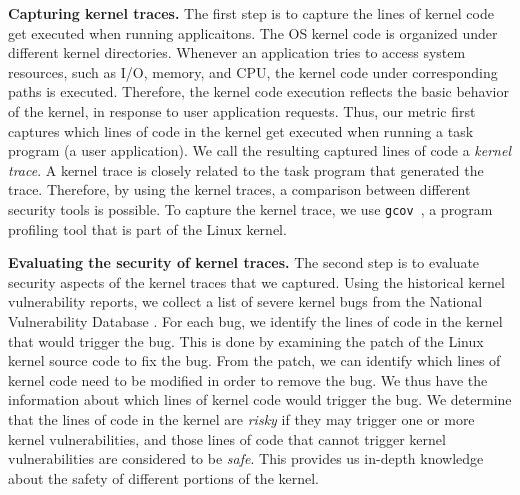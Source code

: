 {\bf Capturing kernel traces.}
The first step is to capture the lines of kernel code get executed when 
running applicaitons. The OS kernel code is organized under different kernel directories. 
Whenever an application tries to access system resources, such as I/O, memory, and CPU, the kernel code 
under corresponding paths is executed. Therefore, the kernel code execution 
reflects the basic behavior of the kernel, in response to user application requests. 
Thus, %
our metric %
first captures which lines of code in the kernel get executed 
when running a task program (a user application). We call the 
resulting captured lines of code a \textit{kernel trace}. A kernel trace is closely
related to the task program that generated the trace. Therefore, 
by using the kernel traces, a comparison between different security tools 
is possible. To capture the kernel trace, 
we use \texttt{gcov}~\cite{gcov}, a program profiling tool that is part of the Linux kernel.

{\bf Evaluating the security of kernel traces.}
The second step is to evaluate security aspects of the kernel traces that we captured. Using the historical kernel vulnerability 
reports, we collect a list of severe kernel bugs from the National Vulnerability Database \cite{NVD}. 
For each bug, we identify the lines of code 
in the kernel that would trigger the bug. 
This is done by examining the patch of the Linux kernel source code to fix the bug. 
From the patch, we can identify which lines of kernel code need to be modified in order to remove 
the bug. We thus have the information about which lines of kernel code would trigger the bug. 
We determine that the lines of code in the kernel are \textit{risky} if they 
may trigger one or more kernel vulnerabilities, and those lines of code that cannot trigger kernel vulnerabilities are 
considered to be \textit{safe}. This provides us in-depth knowledge about the safety of 
different portions of the kernel.

